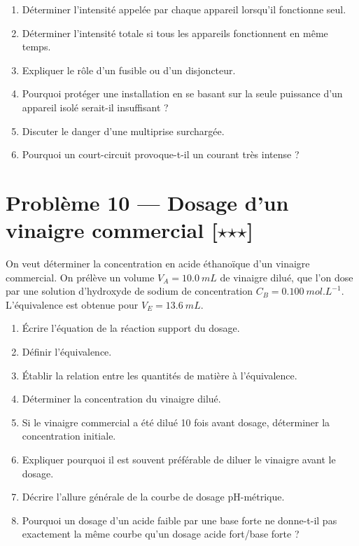 \documentclass[11pt,a4paper]{article}
\newcommand{\etoile}{\ensuremath{\star}}
\begin{document}
\begin{enumerate}[label=\arabic*)]
    \item Déterminer l'intensité appelée par chaque appareil lorsqu'il fonctionne seul.
    \item Déterminer l'intensité totale si tous les appareils fonctionnent en même temps.
    \item Expliquer le rôle d'un fusible ou d'un disjoncteur.
    \item Pourquoi protéger une installation en se basant sur la seule puissance d'un appareil isolé serait-il insuffisant ?
    \item Discuter le danger d'une multiprise surchargée.
    \item Pourquoi un court-circuit provoque-t-il un courant très intense ?
\end{enumerate}

\section*{Problème 10 --- Dosage d'un vinaigre commercial \hfill [\etoile\etoile\etoile]}

On veut déterminer la concentration en acide éthanoïque d'un vinaigre commercial. On prélève un volume $V_A=\SI{10,0}{mL}$ de vinaigre dilué, que l'on dose par une solution d'hydroxyde de sodium de concentration $C_B=\SI{0,100}{mol.L^{-1}}$. L'équivalence est obtenue pour $V_E=\SI{13,6}{mL}$.

\begin{enumerate}[label=\arabic*)]
    \item Écrire l'équation de la réaction support du dosage.
    \item Définir l'équivalence.
    \item Établir la relation entre les quantités de matière à l'équivalence.
    \item Déterminer la concentration du vinaigre dilué.
    \item Si le vinaigre commercial a été dilué 10 fois avant dosage, déterminer la concentration initiale.
    \item Expliquer pourquoi il est souvent préférable de diluer le vinaigre avant le dosage.
    \item Décrire l'allure générale de la courbe de dosage pH-métrique.
    \item Pourquoi un dosage d'un acide faible par une base forte ne donne-t-il pas exactement la même courbe qu'un dosage acide fort/base forte ?
\end{enumerate}
\end{document}
